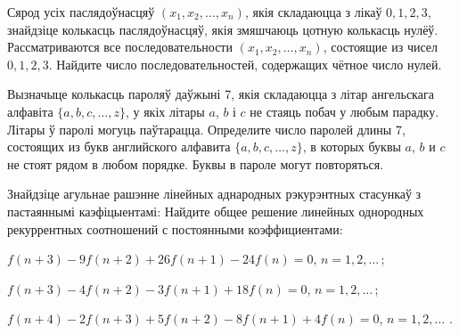 \begin{problemList}
\problemItemSimple
{Сярод усіх паслядоўнасцяў $(x_1, x_2, \ldots, x_n)$, якія складаюцца з лікаў
$0, 1, 2, 3$, знайдзіце колькасць паслядоўнасцяў, якія змяшчаюць цотную колькасць нулёў.}
{Рассматриваются все последовательности $(x_1, x_2, \ldots, x_n)$,
состоящие из чисел $0, 1, 2, 3$. Найдите число последовательностей,
содержащих чётное число нулей.}

\problemItemSimple
{Вызначыце колькасць пароляў даўжыні 7, якія складаюцца з літар ангельскага алфавіта
$\{a, b, c, \ldots, z\}$, у якіх літары $a$, $b$ і $c$ не стаяць побач у любым парадку.
Літары ў паролі могуць паўтарацца.}
{Определите число паролей длины 7, состоящих из букв английского
алфавита $\{a, b, c, \ldots, z\}$, в которых буквы $a$, $b$ и $c$ не
стоят рядом в любом порядке. Буквы в пароле могут повторяться.}

\problemItemWithCommonPart
{Знайдзіце агульнае рашэнне лінейных аднародных рэкурэнтных стасункаў з пастаяннымі каэфіцыентамі:}
{Найдите общее решение линейных однородных рекуррентных соотношений с
постоянными коэффициентами:}
{\begin{belarusianEnumerate}
  \item $f(n + 3) - 9f(n + 2) + 26f(n + 1) - 24f(n) = 0$, $n = 1, 2, \ldots\, $;
  \item $f(n + 3) - 4f(n + 2) - 3f(n + 1) + 18f(n) = 0$, $n = 1, 2, \ldots\, $;
  \item $f(n + 4) - 2f(n + 3) + 5f(n + 2) - 8f(n + 1) + 4f(n) = 0$, $n = 1, 2, \ldots\,\, $.
\end{belarusianEnumerate}}

\end{problemList}


